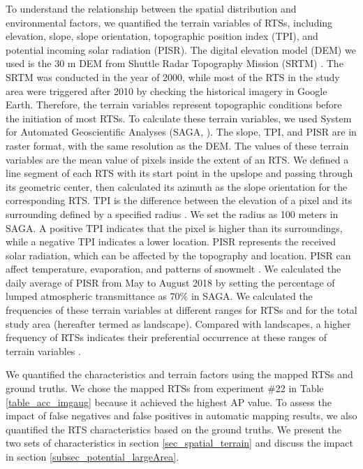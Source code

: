\documentclass[authoryear,preprint,review,12pt]{elsarticle}
\begin{document}
To understand the relationship between the spatial distribution and environmental factors, we quantified the terrain variables of RTSs, including elevation, slope, slope orientation, topographic position index (TPI), and potential incoming solar radiation (PISR). The digital elevation model (DEM) we used is the 30 m DEM from Shuttle Radar Topography Mission (SRTM) \citep{farr2007shuttle}. The SRTM  was conducted in the year of 2000, while most of the RTS in the study area were triggered after 2010 by checking the historical imagery in Google Earth. Therefore, the terrain variables represent topographic conditions before the initiation of most RTSs. To calculate these terrain variables, we used System for Automated Geoscientific Analyses (SAGA, \citealp{conrad2015system}). The slope, TPI, and PISR are in raster format, with the same resolution as the DEM. The values of these terrain variables are the mean value of pixels inside the extent of an RTS. We defined a line segment of each RTS with its start point in the upslope and passing through its geometric center, then calculated its azimuth as the slope orientation for the corresponding RTS. TPI is the difference between the elevation of a pixel and its surrounding defined by a specified radius \citep{guisan1999glm, reu2013application}. We set the radius as 100 meters in SAGA. A positive TPI indicates that the pixel is higher than its surroundings, while a negative TPI indicates a lower location. PISR represents the received solar radiation, which can be affected by the topography and location. PISR can affect temperature, evaporation, and patterns of snowmelt \citep{bohner2009land}. We calculated the daily average of PISR from May to August 2018 by setting the percentage of lumped atmospheric transmittance as 70\% in SAGA. We calculated the frequencies of these terrain variables at different ranges for RTSs and for the total study area (hereafter termed as landscape). Compared with landscapes, a higher frequency of RTSs indicates their preferential occurrence at these ranges of terrain variables \citep{lacelle_distribution_2015}. 


We quantified the characteristics and terrain factors using the mapped RTSs and ground truths. We chose the mapped RTSs from experiment \#22 in Table \ref{table_acc_imgaug} because it achieved the highest AP value. To assess the impact of false negatives and false positives in automatic mapping results, we also quantified the RTS characteristics based on the ground truths. We present the two sets of characteristics in section \ref{sec_spatial_terrain} and discuss the impact in section \ref{subsec_potential_largeArea}. %
\end{document}

